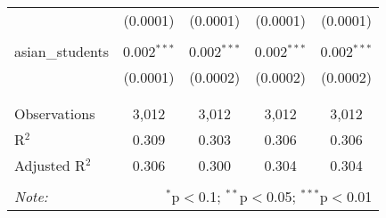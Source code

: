 \begin{table}[!htbp]
\begin{tabular}{@{\extracolsep{-2pt}}lcccc}
  & (0.0001) & (0.0001) & (0.0001) & (0.0001) \\ 
  & & & & \\ 
 asian\_students & 0.002$^{***}$ & 0.002$^{***}$ & 0.002$^{***}$ & 0.002$^{***}$ \\ 
  & (0.0001) & (0.0002) & (0.0002) & (0.0002) \\ 
  & & & & \\ 
\hline \\[-1.8ex] 
Observations & 3,012 & 3,012 & 3,012 & 3,012 \\ 
R$^{2}$ & 0.309 & 0.303 & 0.306 & 0.306 \\ 
Adjusted R$^{2}$ & 0.306 & 0.300 & 0.304 & 0.304 \\ 
\hline 
\hline \\[-1.8ex] 
\textit{Note:}  & \multicolumn{4}{r}{$^{*}$p$<$0.1; $^{**}$p$<$0.05; $^{***}$p$<$0.01} \\ 
\end{tabular} 
\end{table} 
